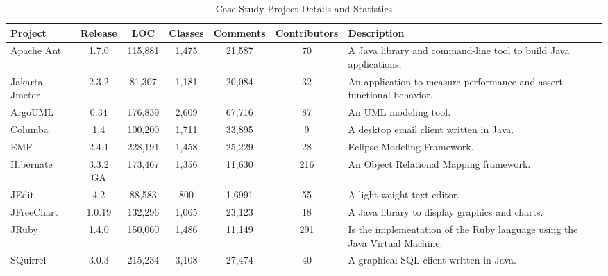\documentclass[conference]{IEEEtran}
\begin{document}
\begin{table}[!tbh]
	\begin{center}
		\caption{Case Study Project Details and Statistics}
		\vspace{-2mm}
		\label{tab:projDetails}
		\begin{tabular}{l| c c c c c | p{2.5in}}
			\toprule
			\textbf{Project} & \textbf{Release} & \textbf{LOC} & \textbf{Classes} & \textbf{Comments} & \textbf{Contributors} & \textbf{Description}                                                      
			\\ \midrule
			Apache Ant       & 1.7.0            & 115,881      & 1,475            & 21,587            & 70                    & A Java library and command-line tool to build Java applications.           \\
			Jakarta Jmeter   & 2.3.2            & 81,307       & 1,181            & 20,084            & 32                    & An application to measure performance and assert functional behavior.      \\
			ArgoUML          & 0.34             & 176,839      & 2,609            & 67,716            & 87                    & An UML modeling tool.                                                      \\
			Columba          & 1.4              & 100,200      & 1,711            & 33,895            & 9                     & A desktop email client written in Java.                                    \\
			EMF              & 2.4.1            & 228,191      & 1,458            & 25,229            & 28                    & Eclipse Modeling Framework.                                                \\
			Hibernate        & 3.3.2 GA         & 173,467      & 1,356            & 11,630            & 216                   & An Object Relational Mapping framework.                                    \\
			JEdit            & 4.2              & 88,583       & 800              & 1,6991            & 55                    & A light weight text editor.                                                \\
			JFreeChart       & 1.0.19           & 132,296      & 1,065            & 23,123            & 18                    & A Java library to display graphics and charts.                             \\
			JRuby            & 1.4.0            & 150,060      & 1,486            & 11,149            & 291                   & Is the implementation of the Ruby language using the Java Virtual Machine. \\
			SQuirrel         & 3.0.3            & 215,234      & 3,108            & 27,474            & 40                    & A graphical SQL client written in Java.                                    
			\\ \bottomrule
		\end{tabular}
	\end{center}
\end{table}
\end{document}
